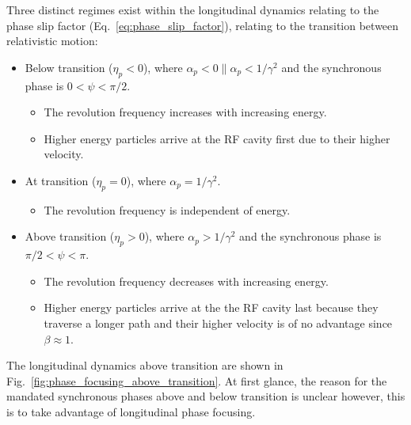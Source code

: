 \documentclass[../main.tex]{subfiles}
\begin{document}
Three distinct regimes exist within the longitudinal dynamics relating to the phase slip factor (Eq.~\ref{eq:phase_slip_factor}), relating to the transition between relativistic motion:
\begin{itemize}
    \item{Below transition ($\eta_{p}<0$), where $\alpha_{p}<0 \parallel \alpha_{p}<1/\gamma^{2}$ and the synchronous phase is $0<\psi<\pi/2$.
    \begin{itemize}
        \item{The revolution frequency increases with increasing energy.}
        \item{Higher energy particles arrive at the RF cavity first due to their higher velocity.}
    \end{itemize}}
    \item{At transition ($\eta_{p}=0$), where $\alpha_{p}=1/\gamma^{2}$.
    \begin{itemize}
        \item{The revolution frequency is independent of energy.} 
    \end{itemize}}
    \item{Above transition ($\eta_{p}>0$), where $\alpha_{p}>1/\gamma^{2}$ and the synchronous phase is $\pi/2<\psi<\pi$.
    \begin{itemize}
        \item{The revolution frequency decreases with increasing energy.}
        \item{Higher energy particles arrive at the the RF cavity last because they traverse a longer path and their higher velocity is of no advantage since $\beta\approx1$.}
    \end{itemize}}
\end{itemize}
The longitudinal dynamics above transition are shown in Fig.~\ref{fig:phase_focusing_above_transition}. At first glance, the reason for the mandated synchronous phases above and below transition is unclear however, this is to take advantage of longitudinal phase focusing. 
\end{document}
